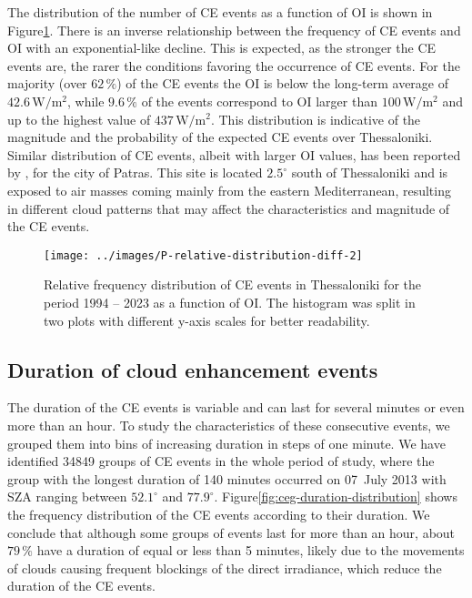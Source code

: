 \documentclass[preprint, 5p,
authoryear]{elsarticle} %
\begin{document}
The distribution of the number of CE events as a function of OI is shown
in Figure\nobreakspace{}\ref{fig:ovir-distribution}. There is an inverse
relationship between the frequency of CE events and OI with an
exponential-like decline. This is expected, as the stronger the CE
events are, the rarer the conditions favoring the occurrence of CE
events. For the majority (over \(62\,\%\)) of the CE events the OI is
below the long-term average of \(42.6\,\text{W}/\text{m}^2\), while
\(9.6\,\%\) of the events correspond to OI larger than
\(100\,\text{W}/\text{m}^2\) and up to the highest value of
\(437\,\text{W}/\text{m}^2\). This distribution is indicative of the
magnitude and the probability of the expected CE events over
Thessaloniki. Similar distribution of CE events, albeit with larger OI
values, has been reported by \citet{Vamvakas2020}, for the city of
Patras. This site is located \(2.5^\circ\) south of Thessaloniki and is
exposed to air masses coming mainly from the eastern Mediterranean,
resulting in different cloud patterns that may affect the
characteristics and magnitude of the CE events.

\begin{figure}

{\centering \texttt{[image: ../images/P-relative-distribution-diff-2]} 

}

\caption{Relative frequency distribution of CE events in Thessaloniki for the period 1994 -- 2023 as a function of OI. The histogram was split in two plots with different y-axis scales for better readability.}\label{fig:ovir-distribution}
\end{figure}

\hypertarget{duration-of-cloud-enhancement-events}{%
\subsection{Duration of cloud enhancement
events}\label{duration-of-cloud-enhancement-events}}

The duration of the CE events is variable and can last for several
minutes or even more than an hour. To study the characteristics of these
consecutive events, we grouped them into bins of increasing duration in
steps of one minute. We have identified 34849 groups of CE events in the
whole period of study, where the group with the longest duration of 140
minutes occurred on 07~July 2013 with SZA ranging between \(52.1^\circ\)
and \(77.9^\circ\).
Figure\nobreakspace{}\ref{fig:ceg-duration-distribution} shows the
frequency distribution of the CE events according to their duration. We
conclude that although some groups of events last for more than an hour,
about \(79\,\%\) have a duration of equal or less than 5 minutes, likely
due to the movements of clouds causing frequent blockings of the direct
irradiance, which reduce the duration of the CE events.
\end{document}
